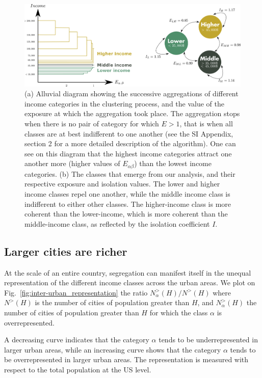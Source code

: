 \begin{figure}
    \includegraphics[width=\textwidth]{./gfx/chapter-segregation/figure1.pdf}
    \caption{(a) Alluvial diagram showing the successive aggregations
      of different income categories in the clustering process, and
      the value of the exposure at which the aggregation took
      place. The aggregation stops when there is no pair of category
      for which $E>1$, that is when all classes are at best
      indifferent to one another (see the SI Appendix, section 2 for a more
      detailed description of the algorithm). One can see on this diagram that
      the highest income categories attract one another more (higher values of
      $E_{\alpha \beta}$) than the lowest income categories. (b) The classes that emerge from our
      analysis, and their respective exposure and isolation values. The lower
      and higher income classes repel one another, while the middle
      income class is indifferent to either other classes.  The
      higher-income class is more coherent than the lower-income,
      which is more coherent than the middle-income class, as
      reflected by the isolation coefficient $I$.}
\label{fig:classes_alluvial}
\end{figure}

\subsection{Larger cities are richer}
\label{sub:inter_urban}

At the scale of an entire country, segregation can manifest itself in the
unequal representation of the different income classes across the urban areas.
We plot on Fig.~\ref{fig:inter-urban_representation} the ratio $
N_\alpha^{>}(H)/N^{>}(H)$ where $N^{>}(H)$ is the number of cities of
population greater than $H$, and $N_\alpha^{>}(H)$ the number of cities of
population greater than $H$ for which the class $\alpha$ is overrepresented.


A decreasing curve indicates that the category $\alpha$ tends to be
underrepresented in larger urban areas, while an increasing curve shows that the
category $\alpha$ tends to be overrepresented in larger urban areas.  The
representation is measured with respect to the total population at the US level.

